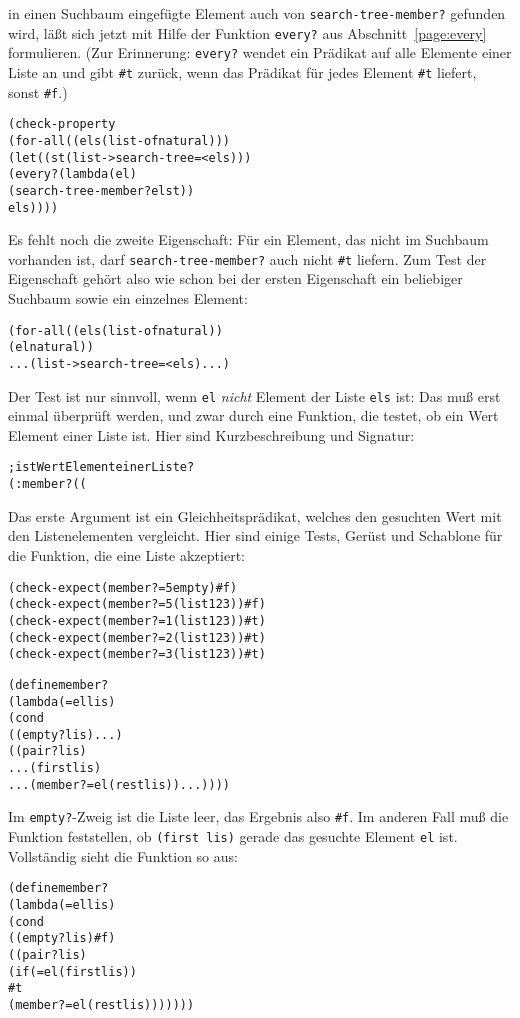 in einen Suchbaum eingefügte Element auch von
\texttt{search-tree-member?} gefunden wird, läßt sich jetzt mit Hilfe
der Funktion \texttt{every?} aus Abschnitt~\ref{page:every}
formulieren.  (Zur Erinnerung: \texttt{every?} wendet ein Prädikat auf
alle Elemente einer Liste an und gibt \verb|#t| zurück, wenn das
Prädikat für jedes Element \verb|#t| liefert, sonst \verb|#f|.)
%
\begin{alltt}
(check-property
 (for-all ((els (list-of natural)))
   (let ((st (list->search-tree = < els)))
     (every? (lambda (el)
               (search-tree-member? el st))
             els))))
\end{alltt}
%
Es fehlt noch die zweite Eigenschaft: Für ein Element, das nicht im
Suchbaum vorhanden ist, darf \texttt{search-tree-member?} auch nicht
\verb|#t| liefern.  Zum Test der Eigenschaft gehört also wie schon bei
der ersten Eigenschaft ein beliebiger Suchbaum sowie ein einzelnes Element:
%
\begin{alltt}
(for-all ((els (list-of natural))
          (el natural))
  ... (list->search-tree = < els) ...)
\end{alltt}
%
Der Test ist nur sinnvoll, wenn \texttt{el} \emph{nicht} Element der Liste
\texttt{els} ist: Das muß erst einmal überprüft werden, und zwar durch
eine Funktion, die testet, ob ein Wert Element einer Liste ist.  Hier
sind Kurzbeschreibung und Signatur:
%
\begin{alltt}
; ist Wert Element einer Liste?
(: member? ((%a %a -> boolean) %a (list-of %a) -> boolean))
\end{alltt}
%
Das erste Argument ist ein Gleichheitsprädikat, welches den gesuchten
Wert mit den Listenelementen vergleicht.  Hier sind einige Tests,
Gerüst und Schablone für die Funktion, die eine Liste akzeptiert:
%
\begin{alltt}
(check-expect (member? = 5 empty) #f)
(check-expect (member? = 5 (list 1 2 3)) #f)
(check-expect (member? = 1 (list 1 2 3)) #t)
(check-expect (member? = 2 (list 1 2 3)) #t)
(check-expect (member? = 3 (list 1 2 3)) #t)

(define member?
  (lambda (= el lis)
    (cond
      ((empty? lis) ...)
      ((pair? lis)
       ... (first lis)
       ... (member? = el (rest lis)) ...))))
\end{alltt}
%
Im \texttt{empty?}-Zweig ist die Liste leer, das Ergebnis also
\verb|#f|.  Im anderen Fall muß die Funktion feststellen, ob
\texttt{(first lis)} gerade das gesuchte Element \texttt{el} ist.
Vollständig sieht die Funktion so aus:
%
\begin{alltt}
(define member?
  (lambda (= el lis)
    (cond
      ((empty? lis) #f)
      ((pair? lis)
       (if (= el (first lis))
           #t
           (member? = el (rest lis)))))))
\end{alltt}
